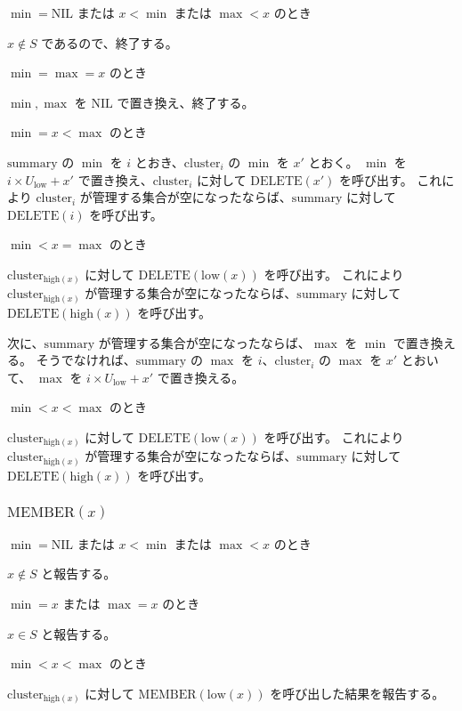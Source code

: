 \documentclass[dvipdfmx,a4j,10pt]{jarticle}
\begin{document}
\noindent [1] $\min = \mathrm{NIL}$ または $x < \min$ または $\max < x$ のとき

$x \notin S$ であるので、終了する。

\noindent [2] $\min = \max = x$ のとき

$\min, \max$ を $\mathrm{NIL}$ で置き換え、終了する。

\noindent [3] $\min = x < \max$ のとき

$\mathrm{summary}$ の $\min$ を $i$ とおき、$\mathrm{cluster}_i$ の $\min$ を $x'$ とおく。
$\min$ を $i \times U_{\mathrm{low}} + x'$ で置き換え、$\mathrm{cluster}_i$ に対して $\mathrm{DELETE}(x')$ を呼び出す。
これにより $\mathrm{cluster}_i$ が管理する集合が空になったならば、$\mathrm{summary}$ に対して $\mathrm{DELETE}(i)$ を呼び出す。

\noindent [4] $\min < x = \max$ のとき

$\mathrm{cluster}_{\mathrm{high}(x)}$ に対して $\mathrm{DELETE}(\mathrm{low}(x))$ を呼び出す。
これにより $\mathrm{cluster}_{\mathrm{high}(x)}$ が管理する集合が空になったならば、$\mathrm{summary}$ に対して $\mathrm{DELETE}({\mathrm{high}(x)})$ を呼び出す。

次に、$\mathrm{summary}$ が管理する集合が空になったならば、$\max$ を $\min$ で置き換える。
そうでなければ、$\mathrm{summary}$ の $\max$ を $i$、$\mathrm{cluster}_i$ の $\max$ を $x'$ とおいて、
$\max$ を $i \times U_{\mathrm{low}} + x'$ で置き換える。

\noindent [5] $\min < x < \max$ のとき

$\mathrm{cluster}_{\mathrm{high}(x)}$ に対して $\mathrm{DELETE}(\mathrm{low}(x))$ を呼び出す。
これにより $\mathrm{cluster}_{\mathrm{high}(x)}$ が管理する集合が空になったならば、$\mathrm{summary}$ に対して $\mathrm{DELETE}({\mathrm{high}(x)})$ を呼び出す。

\subsubsection{$\mathrm{MEMBER}(x)$}

\noindent [1] $\min = \mathrm{NIL}$ または $x < \min$ または $\max < x$ のとき

$x \notin S$ と報告する。

\noindent [2] $\min = x$ または $\max = x$ のとき

$x \in S$ と報告する。

\noindent [3] $\min < x < \max$ のとき

$\mathrm{cluster}_{\mathrm{high}(x)}$ に対して $\mathrm{MEMBER}(\mathrm{low}(x))$ を呼び出した結果を報告する。
\end{document}
